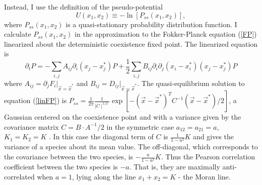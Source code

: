 Instead, I use the definition of the pseudo-potential \cite{Zhou2012}
\begin{equation}
U(x_1,x_2) \equiv -\ln\left[P_{ss}(x_1,x_2)\right],
\label{quasipotential}
\end{equation}
where $P_{ss}(x_1,x_2)$ is a quasi-stationary probability distribution function. 
I calculate $P_{ss}(x_1,x_2)$ in the approximation to the Fokker-Planck equation (\ref{FP}) linearized about the deterministic coexistence fixed point. 
The linearized equation is \cite{Gardiner2004}
\begin{equation}
\partial_t P = -\sum_{i,j} A_{ij}\partial_i (x_j-x_j^*) P + \frac{1}{2} \sum_{i,j} B_{ij} \partial_i\partial_j (x_i-x_i^*) (x_j-x_j^*) P
\label{linFP}
\end{equation}
where $A_{ij}=\partial_j F_i \lvert_{\vec{x}=\vec{x}^*}$ and $B_{ij}=D_{ij} \lvert_{\vec{x}=\vec{x}^*}$.
The quasi-equilibrium solution to equation (\ref{linFP}) is $P_{ss}=\frac{1}{2\pi}\frac{1}{\mid C\mid^{1/2}}\exp[-(\vec{x} - \vec{x}^*)^T C^{-1}(\vec{x} - \vec{x}^*)/2]$, a Gaussian centered on the coexistence point and with a variance given by the covariance matrix $C=B\cdot A^{-1}/2$ in the symmetric case $a_{12}=a_{21}=a$, $K_1=K_2=K$ \cite{VanKampen1992}. 
In this case the diagonal term of $C$ is $\frac{1}{1-a^2}K$ and gives the variance of a species about its mean value. 
The off-diagonal, which corresponds to the covariance between the two species, is $-\frac{a}{1-a^2}K$. 
Thus the Pearson correlation coefficient between the two species is $-a$. 
That is, they are maximally anti-correlated when $a=1$, lying along the line $x_1 + x_2 = K$ - the Moran line. 


